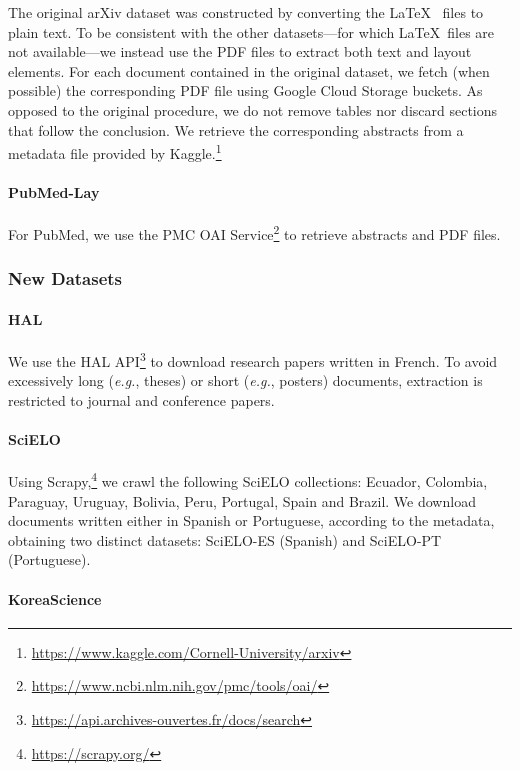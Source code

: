 The original arXiv dataset \citep{cohan2018discourse} was constructed by converting the \LaTeX~ files to plain text. To be consistent with the other datasets—for which \LaTeX~files are not available—we instead use the PDF files to extract both text and layout elements. For each document contained in the original dataset, we fetch (when possible) the corresponding PDF file using Google Cloud Storage buckets. As opposed to the original procedure, we do not remove tables nor discard sections that follow the conclusion. We retrieve the corresponding abstracts from a metadata file provided by Kaggle.\footnote{\url{https://www.kaggle.com/Cornell-University/arxiv}}

\paragraph{PubMed-Lay}

For PubMed, we use the PMC OAI Service\footnote{\url{https://www.ncbi.nlm.nih.gov/pmc/tools/oai/}} to retrieve abstracts and PDF files. 

\subsubsection{New Datasets}

\paragraph{HAL}

We use the HAL API\footnote{\url{https://api.archives-ouvertes.fr/docs/search}} to download research papers written in French. To avoid excessively long (\textit{e.g.}, theses) or short (\textit{e.g.}, posters) documents, extraction is restricted to journal and conference papers. 

\paragraph{SciELO}

Using Scrapy,\footnote{\url{https://scrapy.org/}} we crawl the following SciELO collections: Ecuador, Colombia, Paraguay, Uruguay, Bolivia, Peru, Portugal, Spain and Brazil. We download documents written either in Spanish or Portuguese, according to the metadata, obtaining two distinct datasets: SciELO-ES (Spanish) and SciELO-PT (Portuguese).

\paragraph{KoreaScience}

